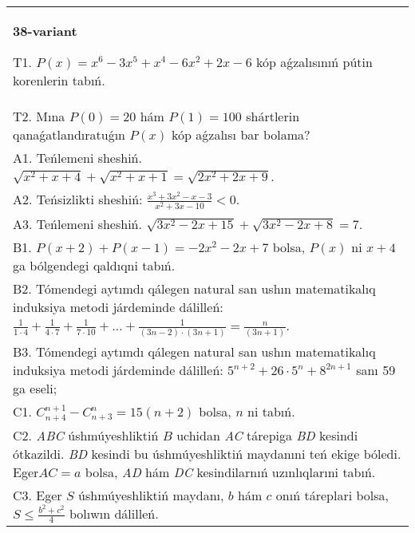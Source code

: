 \documentclass{article}
\begin{document}
\begin{tabular}{m{17cm}}
\textbf{38-variant}
\newline

T1. \(P(x) = x^{6} - 3x^{5} + x^{4} - 6x^{2} + 2x - 6\) kóp aǵzalısınıń pútin korenlerin tabıń. \\
T2. Mına \(P(0) = 20\) hám \(P(1) = 100\) shártlerin qanaǵatlandıratuǵın \(P(x)\) kóp aǵzalısı bar bolama? \\
A1. Teńlemeni sheshiń. \(\sqrt{x^{2} + x + 4} + \sqrt{x^{2} + x + 1} = \sqrt{2x^{2} + 2x + 9}\). \\
A2. Teńsizlikti sheshiń: \(\frac{x^{3} + 3x^{2} - x - 3}{x^{2} + 3x - 10} < 0\). \\
A3. Teńlemeni sheshiń. \(\sqrt{3x^{2} - 2x + 15} + \sqrt{3x^{2} - 2x + 8} = 7\). \\
B1. \(P(x + 2) + P(x - 1) = - 2x^{2} - 2x + 7\) bolsa, \(P(x)\) ni \(x + 4\) ga bólgendegi qaldıqni tabıń. \\
B2. Tómendegi aytımdı qálegen natural san ushın matematikalıq induksiya metodi járdeminde dálilleń: \(\frac{1}{1 \cdot 4} + \frac{1}{4 \cdot 7} + \frac{1}{7 \cdot 10} + \ldots + \frac{1}{(3n - 2) \cdot (3n + 1)} = \frac{n}{(3n + 1)}\). \\
B3. Tómendegi aytımdı qálegen natural san ushın matematikalıq induksiya metodi járdeminde dálilleń: \(5^{n + 2} + 26 \cdot 5^{n} + 8^{2n + 1}\) sanı 59 ga eseli; \\
C1. \(C_{n + 4}^{n + 1} - C_{n + 3}^{n} = 15(n + 2)\) bolsa, \(n\) ni tabıń. \\
C2. \emph{ABC} úshmúyeshliktiń \(B\) uchidan \emph{AC} tárepiga \emph{BD} kesindi ótkazildi. \emph{BD} kesindi bu úshmúyeshliktiń maydanıni teń ekige bóledi. Eger\(AC = a\) bolsa, \emph{AD} hám \emph{DC} kesindilarnıń uzınlıqlarıni tabıń. \\
C3. Eger \(S\) úshmúyeshliktiń maydanı, \(b\) hám \(c\) onıń táreplari bolsa, \(S \leq \frac{b^{2} + c^{2}}{4}\) bolıwın dálilleń. \\

\end{tabular}
\vspace{1cm}
\end{document}
